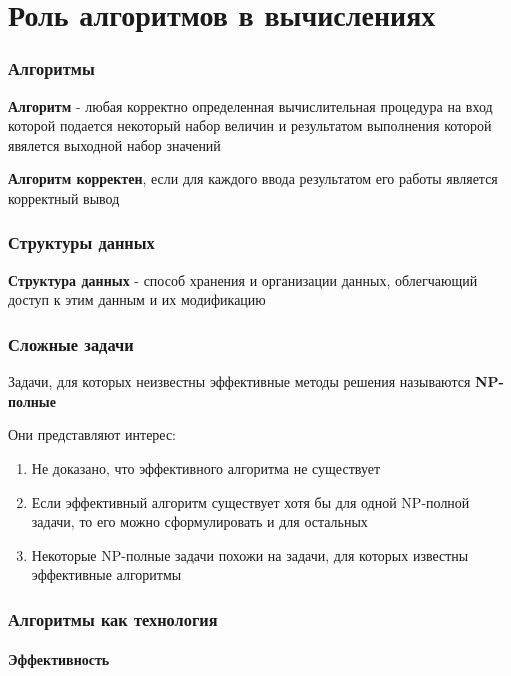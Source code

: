 \documentclass[a4paper, 12pt]{article}
\begin{document}
\part{Роль алгоритмов в вычислениях}

\section{Алгоритмы}

\textbf{Алгоритм} - любая корректно определенная вычислительная процедура на вход которой подается некоторый набор величин и 
результатом выполнения которой явялется выходной набор значений

\textbf{Алгоритм корректен}, если для каждого ввода результатом его работы является корректный вывод

\section{Структуры данных}

\textbf{Структура данных} - способ хранения и организации данных, облегчающий доступ к этим данным и их модификацию

\section{Сложные задачи}

Задачи, для которых неизвестны эффективные методы решения называются \textbf{NP-полные}

Они представляют интерес:

\begin{enumerate}
    \item Не доказано, что эффективного алгоритма не существует
    \item Если эффективный алгоритм существует хотя бы для одной NP-полной задачи, то его можно сформулировать и для остальных
    \item Некоторые NP-полные задачи похожи на задачи, для которых известны эффективные алгоритмы
\end{enumerate}

\section{Алгоритмы как технология}

\subsection{Эффективность}
\end{document}
